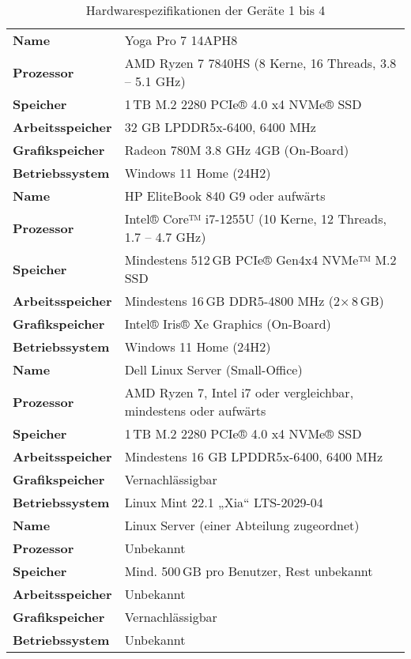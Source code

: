 \begin{table}[htbp]
  \centering
  \footnotesize %
  \caption{Hardwarespezifikationen der Geräte 1 bis 4}
  \renewcommand{\arraystretch}{1.2}
  \begin{tabularx}{\textwidth}{l X}
  \toprule
  \textbf{Name} & Yoga Pro 7 14APH8 \\ 
  \textbf{Prozessor} & AMD Ryzen 7 7840HS (8 Kerne, 16 Threads, 3.8 -- 5.1 GHz) \\
  \textbf{Speicher} & 1 TB M.2 2280 PCIe® 4.0 x4 NVMe® SSD \\
  \textbf{Arbeitsspeicher} & 32 GB LPDDR5x-6400, 6400 MHz \\
  \textbf{Grafikspeicher} & Radeon 780M 3.8 GHz 4GB (On-Board) \\
  \textbf{Betriebssystem} & Windows 11 Home (24H2) \\
  \midrule
  \textbf{Name} & HP EliteBook 840 G9 oder aufwärts \\
  \textbf{Prozessor} & Intel® Core™ i7-1255U (10 Kerne, 12 Threads, 1.7 -- 4.7 GHz) \\
  \textbf{Speicher} & Mindestens 512 GB PCIe® Gen4x4 NVMe™ M.2 SSD \\
  \textbf{Arbeitsspeicher} & Mindestens 16 GB DDR5-4800 MHz (2× 8 GB) \\
  \textbf{Grafikspeicher} & Intel® Iris® Xe Graphics (On-Board) \\
  \textbf{Betriebssystem} & Windows 11 Home (24H2) \\
  \midrule
  \textbf{Name} & Dell Linux Server (Small-Office) \\
  \textbf{Prozessor} & AMD Ryzen 7, Intel i7 oder vergleichbar, mindestens oder aufwärts \\
  \textbf{Speicher} & 1 TB M.2 2280 PCIe® 4.0 x4 NVMe® SSD \\
  \textbf{Arbeitsspeicher} & Mindestens 16 GB LPDDR5x-6400, 6400 MHz \\
  \textbf{Grafikspeicher} & Vernachlässigbar \\
  \textbf{Betriebssystem} & Linux Mint 22.1 „Xia“ LTS-2029-04 \\
  \midrule
  \textbf{Name} & Linux Server (einer Abteilung zugeordnet) \\
  \textbf{Prozessor} & Unbekannt \\
  \textbf{Speicher} & Mind. 500 GB pro Benutzer, Rest unbekannt \\
  \textbf{Arbeitsspeicher} & Unbekannt \\
  \textbf{Grafikspeicher} & Vernachlässigbar \\
  \textbf{Betriebssystem} & Unbekannt \\
  \bottomrule
  \end{tabularx}
\end{table}
